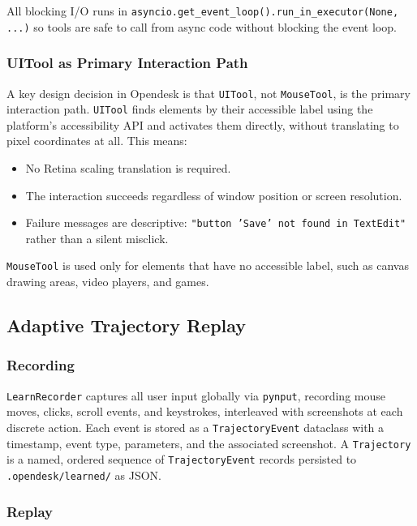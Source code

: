 \documentclass[11pt]{article}
\begin{document}
All blocking I/O runs in \texttt{asyncio.get\_event\_loop().run\_in\_executor(None, ...)} so tools are safe to call from async code without blocking the event loop.

\subsubsection{UITool as Primary Interaction Path}

A key design decision in Opendesk is that \texttt{UITool}, not \texttt{MouseTool}, is the primary interaction path. \texttt{UITool} finds elements by their accessible label using the platform's accessibility API and activates them directly, without translating to pixel coordinates at all. This means:

\begin{itemize}
    \item No Retina scaling translation is required.
    \item The interaction succeeds regardless of window position or screen resolution.
    \item Failure messages are descriptive: \texttt{"button 'Save' not found in TextEdit"} rather than a silent misclick.
\end{itemize}

\texttt{MouseTool} is used only for elements that have no accessible label, such as canvas drawing areas, video players, and games.

\subsection{Adaptive Trajectory Replay}

\subsubsection{Recording}

\texttt{LearnRecorder} captures all user input globally via \texttt{pynput}, recording mouse moves, clicks, scroll events, and keystrokes, interleaved with screenshots at each discrete action. Each event is stored as a \texttt{TrajectoryEvent} dataclass with a timestamp, event type, parameters, and the associated screenshot. A \texttt{Trajectory} is a named, ordered sequence of \texttt{TrajectoryEvent} records persisted to \texttt{.opendesk/learned/} as JSON.

\subsubsection{Replay}
\end{document}
